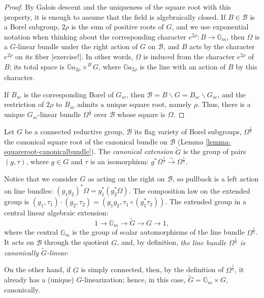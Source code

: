 \begin{proof}
By Galois descent and the uniqueness of the square root with this property, it is enough to assume that the field is algebraically closed. If $B\in \mathcal B$ is a Borel subgroup, $2\rho$ is the sum of positive roots of $G$, and we use exponential notation when thinking about the corresponding character $e^{2\rho}:B\to \mathbb G_m$, then $\Omega$ is a $G$-linear bundle under the right action of $G$ on $\mathcal B$, and $B$ acts by the character $e^{2\rho}$ on its fiber [exercise!]. In other words, $\Omega$ is induced from the character $e^{2\rho}$ of $B$; its total space is $\mathbb Ga_{2\rho} \times^B G$,
where $\mathbb Ga_{2\rho}$ is the line with an action of $B$ by this character.

If $B_{sc}$ is the corresponding Borel of $G_{sc}$, then $\mathcal B = B\backslash G=B_{sc}\backslash G_{sc}$, and the restriction of $2\rho$ to $B_{sc}$ admits a unique square root, namely $\rho$. Thus, there is a unique $G_{sc}$-linear bundle $\Omega^{\frac{1}{2}}$ over $\mathcal B$ whose square is $\Omega$.
\end{proof}



\begin{definition}
 \label{definition-canonical-extension}
Let $G$ be a connected reductive group, $\mathcal B$ its flag variety of Borel subgroups, $\Omega^\frac{1}{2}$ the canonical square root of the canonical bundle on $\mathcal B$ (Lemma \ref{lemma-squareroot-canonicalbundle}). The {\it canonical extension} $\tilde G$ is the group of pairs $(g,\tau)$, where $g\in G$ and $\tau$ is an isomorphism: $g^*\Omega^\frac{1}{2}\xrightarrow\sim \Omega^\frac{1}{2}$.
\end{definition}

\begin{remark}
 \label{remark-canonical-extension}
Notice that we consider $G$ as acting on the right on $\mathcal B$, so pullback is a left action on line bundles: $(g_1g_2)^*\Omega = g_1^*(g_2^*\Omega)$. The composition law on the extended group is $(g_1,\tau_1)\cdot (g_2,\tau_2) = (g_1g_2, \tau_1\circ(g_1^*\tau_2))$. The extended group in a central linear algebraic extension:
\begin{equation}
\label{equation-canonical-extension} 1\to \mathbb G_m \to \tilde G \to G \to 1,
\end{equation}
where the central $\mathbb G_m$ is the group of scalar automorphisms of the line bundle $\Omega^\frac{1}{2}$. It acts on $\mathcal B$ through the quotient $G$, and, by definition, \emph{the line bundle $\Omega^\frac{1}{2}$ is canonically $\tilde G$-linear}.

On the other hand, if $G$ is simply connected, then, by the definition of $\Omega^\frac{1}{2}$, it already has a (unique) $G$-linearization; hence, in this case, $\tilde G = \mathbb G_m \times G$, canonically.
\end{remark}


